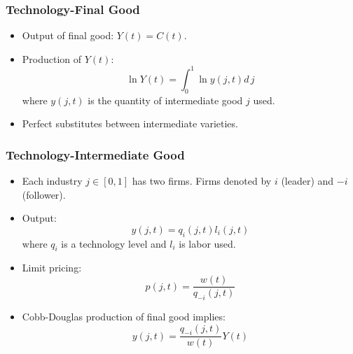 \documentclass{beamer}
\begin{document}
\begin{frame}[t]\frametitle{Technology-Final Good} 
  \begin{itemize}
    \item<+-> Output of final good: $Y(t) = C(t)$.
    
    \item<+-> Production of $Y(t)$:
      \begin{equation*} \label{eq:tech_output}
        \ln Y(t) = \int_{0}^{1} \ln y(j, t) d\,j 
      \end{equation*}
      where $y(j, t)$ is the quantity of intermediate good $j$ used.
    \item<+-> Perfect substitutes between intermediate varieties.
    
  \end{itemize}
\end{frame}

\begin{frame}[t]\frametitle{Technology-Intermediate Good} 
  \begin{itemize}
    \item<+-> Each industry $j \in [0, 1]$ has two firms. Firms denoted by $i$ (leader) and $-i$ (follower).

    \item<+-> Output:
      \begin{equation*} \label{eq:intermediate_production}
        y(j, t) = q_i(j, t)l_i(j, t)
      \end{equation*}
      where $q_i$ is a technology level and $l_i$ is labor used. 

    \item<+-> Limit pricing:
      \begin{equation*} \label{eq:limit_pricing}
        p(j, t) = \frac{w(t)}{q_{-i}(j, t)}      
      \end{equation*}

    \item<+-> Cobb-Douglas production of final good implies:
      \begin{equation*}
        y(j, t) = \frac{q_{-i}(j, t)}{w(t)}Y(t)
      \end{equation*}
  \end{itemize}
\end{frame}
\end{document}
